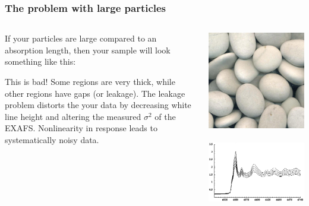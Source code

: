 \documentclass[10pt, xcolor=x11names, compress]{beamer}
\begin{document}
\begin{frame}
  \frametitle{The problem with large particles}
  \begin{columns}
    \begin{column}{0.6\linewidth}
      If your particles are large compared to an absorption length,
      then your sample will look something like this:

      \bigskip

      \begin{alertblock}{This is bad!}
        Some regions are very thick, while other regions have gaps (or
        leakage).  The leakage problem distorts the your data by
        decreasing white line height and altering the measured
        $\sigma^2$ of the EXAFS.  Nonlinearity in response leads to
        systematically noisy data.
      \end{alertblock}
    \end{column}
    \begin{column}{0.4\linewidth}
      \includegraphics[width=0.9\linewidth]{sample/pebbles.jpg}
      ~\\[3ex]
      \includegraphics[width=0.9\linewidth]{sample/leakage.png}

\end{column}
\end{columns}
\end{frame}
\end{document}
